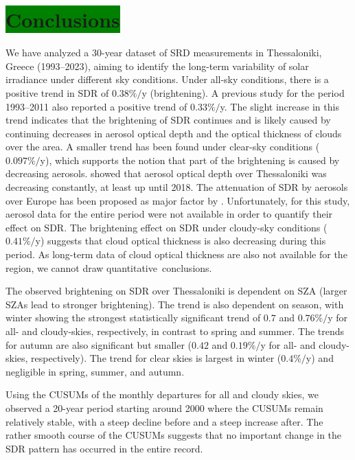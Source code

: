 \documentclass[applsci,article,accept,moreauthors,pdftex]{Definitions/mdpi}
\begin{document}
\hypertarget{conclusions}{%
\section{\colorbox{green}{Conclusions}\label{conclusions}}} %

We have analyzed a 30-year dataset of SRD measurements in Thessaloniki,
Greece (1993--2023), aiming to identify the long-term variability of
solar irradiance under different sky conditions. Under all-sky
conditions, there is a positive trend in SDR of \(0.38\%/\)y
(brightening). A previous study \citep{Bais2013} for the period 1993--2011 also reported a positive trend of \(0.33\%/\)y. The slight
increase in this trend indicates that the brightening of SDR continues
and is likely caused by continuing decreases in aerosol optical depth
and the optical thickness of clouds over the area. A smaller trend has
been found under clear-sky conditions (\(0.097\%/\)y), which supports
the notion that part of the brightening is caused by decreasing
aerosols. \citet{Siomos2020} showed that aerosol optical depth over
Thessaloniki was decreasing constantly, at least up until 2018. The
attenuation of SDR by aerosols over Europe has been proposed as major
factor by \citet{Wild2021}. Unfortunately, for this study, aerosol data
for the entire period were not available in order to quantify their
effect on SDR. The brightening effect on SDR under cloudy-sky conditions
(\(0.41\%/\)y) suggests that cloud optical thickness is also
decreasing during this period. As long-term data of cloud optical
thickness are also not available for the region, we cannot draw
quantitative~conclusions.

The observed brightening on SDR over Thessaloniki is dependent on SZA
(larger SZAs lead to stronger brightening). The trend is also dependent
on season, with winter showing the strongest statistically significant
trend of \(0.7\) and \(0.76\%/\)y for all- and cloudy-skies,
respectively, in contrast to spring and summer. The trends for autumn
are also significant but smaller (\(0.42\) and \(0.19\%/\)y for all-
and cloudy-skies, respectively). The trend for clear skies is largest in
winter (\(0.4\%/\)y) and negligible in spring, summer, and autumn.

Using the CUSUMs of the monthly departures for all and cloudy skies, we
observed a 20-year period starting around 2000 where the CUSUMs remain
relatively stable, with a steep decline before and a steep increase
after. The rather smooth course of the CUSUMs suggests that no important
change in the SDR pattern has occurred in the entire record.
\end{document}
